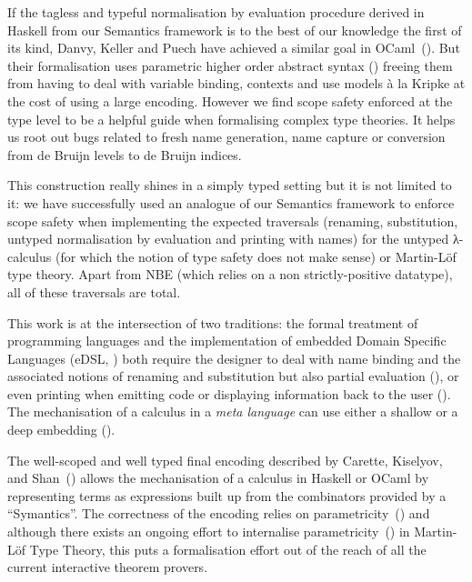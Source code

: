 If the tagless and typeful normalisation by evaluation procedure derived
in Haskell from our Semantics framework is to the best of our knowledge
the first of its kind, Danvy, Keller and Puech have achieved a similar
goal in OCaml~(\citeyear{danvytagless}). But their formalisation uses
parametric higher order abstract syntax (\cite{chlipala2008parametric})
freeing them from having to deal with variable binding, contexts and use
models à la Kripke at the cost of using a large encoding.
%
However we find scope safety enforced at the type level to be a helpful
guide when formalising complex type theories. It helps us root out bugs
related to fresh name generation, name capture or conversion from de
Bruijn levels to de Bruijn indices.

This construction really shines in a simply typed setting but it is not
limited to it: we have successfully used an analogue of our Semantics
framework to enforce scope safety when implementing the expected traversals
(renaming, substitution, untyped normalisation by evaluation and printing
with names) for the untyped λ-calculus (for which the notion of type safety
does not make sense) or Martin-Löf type theory. Apart from NBE (which relies
on a non strictly-positive datatype), all of these traversals are total.

This work is at the intersection of two traditions: the formal treatment
of programming languages and the implementation of embedded Domain Specific
Languages (eDSL, \cite{hudak1996building}) both require the designer to
deal with name binding and the associated notions of renaming and substitution
but also partial evaluation (\cite{danvy1999type}), or even printing when
emitting code or displaying information back to the user
(\cite{wiedijk2012pollack}).
%
The mechanisation of a calculus in a \emph{meta language} can use either
a shallow or a deep embedding
(\cite{svenningsson2013combining,gill2014domain}).


The well-scoped and well typed final encoding described by Carette, Kiselyov,
and Shan~(\citeyear{carette2009finally}) allows the mechanisation of a calculus in
Haskell or OCaml by representing terms as expressions built up from the
combinators provided by a ``Symantics''. The correctness of the encoding
relies on parametricity~(\cite{reynolds1983types}) and although there exists
an ongoing effort to internalise parametricity~(\cite{bernardy2013type}) in
Martin-Löf Type Theory, this puts a formalisation effort out of the reach of all the
current interactive theorem provers.

